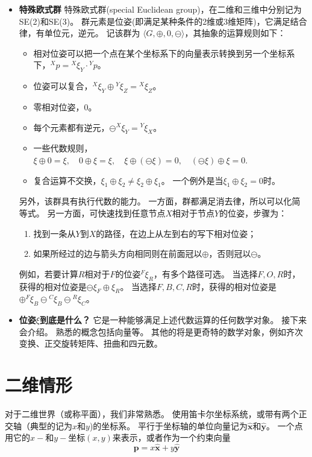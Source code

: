\documentclass[UTF8,a4paper,10pt]{ctexart}
\begin{document}
\begin{itemize}
\item{\textbf{特殊欧式群}}
  特殊欧式群(special Euclidean group)，在二维和三维中分别记为SE(2)和SE(3)。
  群元素是位姿(即满足某种条件的2维或3维矩阵)，它满足结合律，有单位元，逆元。
  记该群为 $\langle G,\oplus,0,\ominus\rangle$，其抽象的运算规则如下：
  \begin{itemize}
  \item {相对位姿可以把一个点在某个坐标系下的向量表示转换到另一个坐标系下}，${}^Xp={}^X\xi_Y\cdot{}^Yp$。
  \item{位姿可以复合}，${}^X\xi_Y\oplus{}^Y\xi_Z={}^X\xi_Z$。
  \item{零相对位姿，$0$}。
  \item{每个元素都有逆元}，$\ominus{}^X\xi_Y={}^Y\xi_X$。
  \item{一些代数规则}，
    $
    \xi\oplus0=\xi,\quad0\oplus\xi=\xi,\quad\xi\oplus(\ominus\xi)=0,\quad(\ominus\xi)\oplus\xi=0.
    $
  \item {复合运算不交换}，$\xi_1\oplus\xi_2\ne\xi_2\oplus\xi_1$。
    一个例外是当$\xi_1\oplus\xi_2=0$时。
  \end{itemize}
  另外，该群具有执行代数的能力。
  一方面，群都满足消去律，所以可以化简等式。
  另一方面，可快速找到任意节点$X$相对于节点$Y$的位姿，步骤为：
  \begin{enumerate}
  \item 找到一条从$Y$到$X$的路径，在边上从左到右的写下相对位姿；
  \item 如果所经过的边与箭头方向相同则在前面冠以$\oplus$，否则冠以$\ominus$。
  \end{enumerate}
  例如，若要计算$R$相对于$F$的位姿${}^F\xi_R$，有多个路径可选。
  当选择$F,O,R$时，获得的相对位姿是$\ominus\xi_F\oplus\xi_R$。
  当选择$F,B,C,R$时，获得的相对位姿是$\oplus{}^F\xi_B\ominus{}^C\xi_B\ominus{}^R\xi_C$。
\item{\textbf{位姿$\xi$到底是什么？}}
  它是一种能够满足上述代数运算的任何数学对象。
  接下来会介绍。
  熟悉的概念包括向量等。
  其他的将是更奇特的数学对象，例如齐次变换、正交旋转矩阵、扭曲和四元数。
\end{itemize}

\section{二维情形}\label{sec:2D}

对于二维世界（或称平面），我们非常熟悉。
使用笛卡尔坐标系统，或带有两个正交轴（典型的记为$x$和$y$)的坐标系。
平行于坐标轴的单位向量记为$\hat{\mathbf{x}}$和$\hat{\mathbf{y}}$。
一个点用它的$x-$和$y-$坐标$(x,y)$来表示，或者作为一个约束向量
$$\mathbf{p}=x\hat{\mathbf{x}}+y\hat{\mathbf{y}}$$
\end{document}

